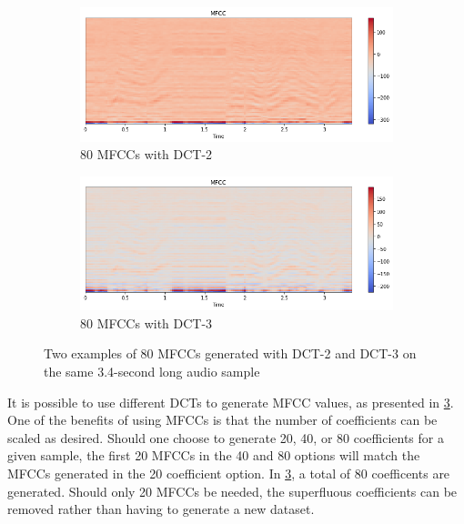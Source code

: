 \begin{figure}
    \centering
    \begin{subfigure}[b]{.49\textwidth}
        \centering
        \includegraphics[width=\textwidth]{figures/mfcc2.png}
        \caption{80 MFCCs with DCT-2}
        \label{sfig:mfcc2example}
    \end{subfigure}
    \hfill
    \begin{subfigure}[b]{.49\textwidth}
        \centering
        \includegraphics[width=\textwidth]{figures/mfcc3.png}
        \caption{80 MFCCs with DCT-3}
        \label{sfig:mfcc3example}
    \end{subfigure}
    \caption{Two examples of 80 MFCCs generated with DCT-2 and DCT-3 on the same 3.4-second long audio sample}
    \label{fig:mfccexample}
\end{figure}

It is possible to use different DCTs to generate MFCC values, as presented in \cref{fig:mfccexample}.
One of the benefits of using MFCCs is that the number of coefficients can be scaled as desired.
Should one choose to generate 20, 40, or 80 coefficients for a given sample, the first 20 MFCCs in the 40 and 80 options will match the MFCCs generated in the 20 coefficient option.
In \cref{fig:mfccexample}, a total of 80 coefficents are generated.
Should only 20 MFCCs be needed, the superfluous coefficients can be removed rather than having to generate a new dataset.

